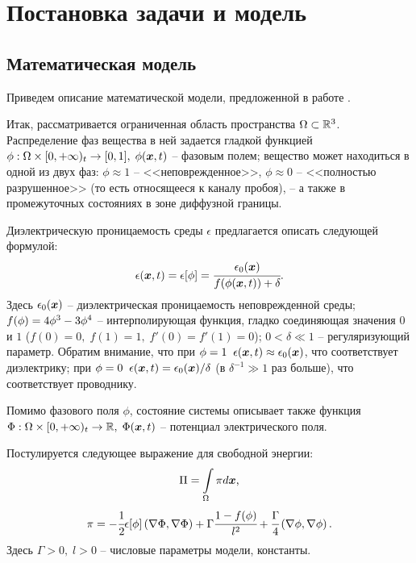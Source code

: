 
\section{Постановка задачи и модель}

\subsection{Математическая модель}

Приведем описание математической модели, предложенной в работе \cite{pitike_dielectric_breakdown}.

Итак, рассматривается ограниченная область пространства $\Omega \subset {\mathbb{R}}^3$. Распределение фаз вещества в ней задается гладкой функцией $\phi: \Omega \times [0, +\infty)_t \hm \to [0, 1], \; \phi(\vx, t)$ -- фазовым полем; вещество может находиться в одной из двух фаз: $\phi \approx 1$ -- <<неповрежденное>>, $\phi \approx 0$ -- <<полностью разрушенное>> (то есть относящееся к каналу пробоя), -- а также в промежуточных состояниях в зоне диффузной границы.

Диэлектрическую проницаемость среды $\epsilon$ предлагается описать следующей формулой:
\begin{equation}
	\epsilon({\boldsymbol{x}}, t) = \epsilon[\phi] = \cfrac{\epsilon_0({\boldsymbol{x}})}{f(\phi({\boldsymbol{x}}, t)) + \delta} {\text{.}}
	\label{eq:epsilon}
\end{equation}
Здесь $\epsilon_0({\boldsymbol{x}})$ -- диэлектрическая проницаемость неповрежденной среды; $f(\phi) \hm = 4\phi^3 - 3\phi^4$ -- интерполирующая функция, гладко соединяющая значения $0$ и $1$ ($f(0) = 0, \; f(1) = 1, \; f'(0) = f'(1) = 0$); $0 < \delta \ll 1$ -- регуляризующий параметр. Обратим внимание, что при $\phi = 1 \;\; \epsilon({\boldsymbol{x}}, t) \approx \epsilon_0({\boldsymbol{x}})$, что соответствует диэлектрику; при $\phi = 0 \;\; \epsilon({\boldsymbol{x}}, t) = \epsilon_0({\boldsymbol{x}}) / \delta$ (в $\delta^{-1} \gg 1$ раз больше), что соответствует проводнику.

Помимо фазового поля $\phi$, состояние системы описывает также функция $\Phi: \Omega \times [0, +\infty)_t \to {\mathbb{R}}, \; \Phi({\boldsymbol{x}}, t)$ -- потенциал электрического поля.

Постулируется следующее выражение для свободной энергии:
$$\Pi = \int \limits_\Omega \pi d {\boldsymbol{x}} {\text{,}}$$
$$\pi = -\cfrac{1}{2} \epsilon[\phi] \left( \nabla \Phi, \nabla \Phi \right) + \Gamma \cfrac{1 - f(\phi)}{l^2} + \cfrac{\Gamma}{4} \left( \nabla \phi, \nabla \phi \right) {\text{.}}$$
Здесь $\Gamma > 0, \; l > 0$ -- числовые параметры модели, константы.

